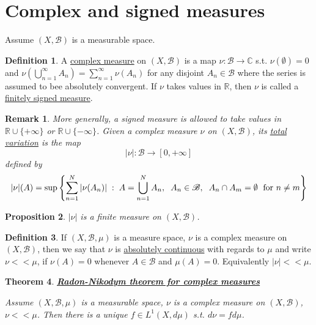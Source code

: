 \documentclass{article}
\newtheorem{theorem}{Theorem}[section]
\newtheorem{proposition}[theorem]{Proposition}
\newtheorem*{remark}{Remark}
\theoremstyle{definition}
\newtheorem{definition}[theorem]{Definition}
\newcommand{\R}{\mathbb{R}}
\newcommand{\C}{\mathbb{C}}
\newcommand{\omm}{\hspace{1mm}}
\newcommand{\tmm}{\hspace{2mm}}
\newcommand{\B}{\mathscr{B}}
\begin{document}
\section{Complex and signed measures}
Assume $(X,\B)$ is a measurable space. 
\begin{definition}
    A \underline{complex measure} on $(X,\B)$ is a map $\nu:\B\rightarrow \C$ s.t. $\nu(\emptyset)=0$ and $\nu(\bigcup_{n=1}^\infty A_n) = \sum_{n=1}^{\infty}\nu(A_n)$
    for any disjoint $A_n\in\B$ where the series is assumed to bee absolutely convergent. If $\nu$ takes values in $\R$, then $\nu$ is called a \underline{finitely signed measure}.
\end{definition}

\begin{remark}
    More generally, a signed measure is allowed to take values in $\R\cup\{+\infty\}$ or $\R\cup\{-\infty\}$. Given a complex measure $\nu$ on $(X,\B )$, its 
    \underline{total variation} is the map $$|\nu|:\B\rightarrow [0,+\infty]$$
    defined by $$|\nu|(A) = \sup\left\{ \sum_{n=1}^{N}|\nu(A_n)|\omm:\omm A=\bigcup_{n=1}^N A_n,\tmm A_n\in\B,\tmm A_n\cap A_m=\emptyset \omm \text{  for }n\neq m \right\}$$
\end{remark}

\begin{proposition}
    $|\nu|$ is a finite measure on $(X,\B)$.
\end{proposition}

\begin{definition}
    If $(X,\B,\mu)$ is a measure space, $\nu$ is a complex measure on $(X,\B)$, then we say that $\nu$ is \underline{absolutely continuous} with regards to $\mu$
    and write $\nu<<\mu$, if $\nu(A)=0$ whenever $A\in\B$ and $\mu(A)=0$. Equivalently $|\nu|<<\mu$.
\end{definition}

\begin{theorem}\underline{\textbf{Radon-Nikodym theorem for complex measures}}

    Assume $(X,\B,\mu)$ is a measurable space, $\nu$ is a complex measure on $(X,\B)$, $\nu<<\mu$. Then there 
    is a unique $f\in L^1(X,d\mu)$ s.t. $d\nu = fd\mu$.
\end{theorem}
\end{document}
